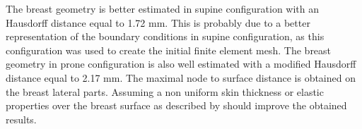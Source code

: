 The breast geometry is better estimated in supine configuration with an Hausdorff distance equal to 1.72 mm. This is probably due to a better representation of the boundary conditions in supine configuration, as this configuration was used to create the initial finite element mesh. The breast geometry in prone configuration is also well estimated with a modified Hausdorff distance equal to 2.17 mm. The maximal node to surface distance is obtained on the breast lateral parts.  Assuming a non uniform skin thickness or elastic properties over the breast surface as described by \cite{sutradhar_vivo_2013} should improve the obtained results. 





